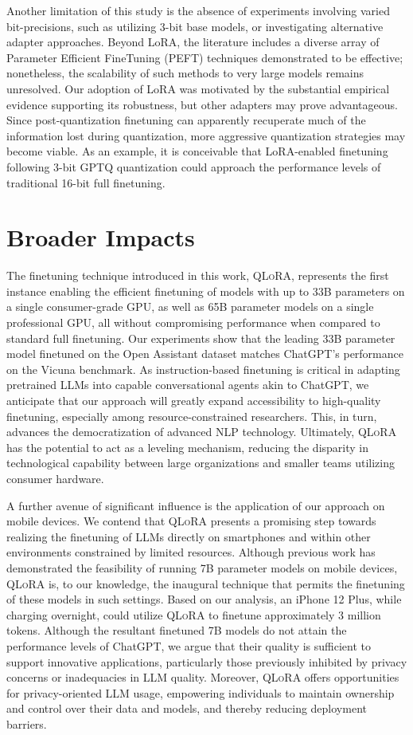 Another limitation of this study is the absence of experiments involving varied bit-precisions, such as utilizing 3-bit base models, or investigating alternative adapter approaches. Beyond LoRA, the literature includes a diverse array of Parameter Efficient FineTuning (PEFT) techniques demonstrated to be effective; nonetheless, the scalability of such methods to very large models remains unresolved. Our adoption of LoRA was motivated by the substantial empirical evidence supporting its robustness, but other adapters may prove advantageous. Since post-quantization finetuning can apparently recuperate much of the information lost during quantization, more aggressive quantization strategies may become viable. As an example, it is conceivable that LoRA-enabled finetuning following 3-bit GPTQ quantization could approach the performance levels of traditional 16-bit full finetuning.

\section{Broader Impacts}

The finetuning technique introduced in this work, \textsc{QLoRA}, represents the first instance enabling the efficient finetuning of models with up to 33B parameters on a single consumer-grade GPU, as well as 65B parameter models on a single professional GPU, all without compromising performance when compared to standard full finetuning. Our experiments show that the leading 33B parameter model finetuned on the Open Assistant dataset matches ChatGPT’s performance on the Vicuna benchmark. As instruction-based finetuning is critical in adapting pretrained LLMs into capable conversational agents akin to ChatGPT, we anticipate that our approach will greatly expand accessibility to high-quality finetuning, especially among resource-constrained researchers. This, in turn, advances the democratization of advanced NLP technology. Ultimately, \textsc{QLoRA} has the potential to act as a leveling mechanism, reducing the disparity in technological capability between large organizations and smaller teams utilizing consumer hardware.

A further avenue of significant influence is the application of our approach on mobile devices. We contend that \textsc{QLoRA} presents a promising step towards realizing the finetuning of LLMs directly on smartphones and within other environments constrained by limited resources. Although previous work has demonstrated the feasibility of running 7B parameter models on mobile devices, \textsc{QLoRA} is, to our knowledge, the inaugural technique that permits the finetuning of these models in such settings. Based on our analysis, an iPhone 12 Plus, while charging overnight, could utilize \textsc{QLoRA} to finetune approximately 3 million tokens. Although the resultant finetuned 7B models do not attain the performance levels of ChatGPT, we argue that their quality is sufficient to support innovative applications, particularly those previously inhibited by privacy concerns or inadequacies in LLM quality. Moreover, \textsc{QLoRA} offers opportunities for privacy-oriented LLM usage, empowering individuals to maintain ownership and control over their data and models, and thereby reducing deployment barriers.

